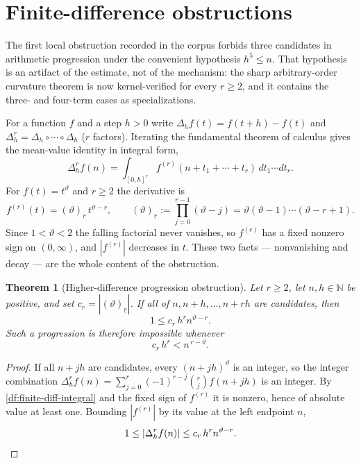 \documentclass[11pt,oneside]{article}
\newtheorem{theorem}{Theorem}[section]
\theoremstyle{definition}
\theoremstyle{remark}
\newcommand{\N}{\mathbb N}
\newcommand{\thetaq}{\vartheta}
\newcommand{\fall}[2]{\left(#1\right)_{\!\underline{#2}}}
\begin{document}
\section{Finite-difference obstructions}
\label{sec:differences}

The first local obstruction recorded in the corpus forbids three candidates in arithmetic
progression under the convenient hypothesis $h^{5}\le n$.  That hypothesis is an artifact of
the estimate, not of the mechanism: the sharp arbitrary-order curvature theorem is now
kernel-verified for every $r\ge2$, and it contains the three- and four-term cases as
specializations.

For a function $f$ and a step $h>0$ write $\Delta_hf(t)=f(t+h)-f(t)$ and
$\Delta_h^{r}=\Delta_h\circ\cdots\circ\Delta_h$ ($r$ factors).  Iterating the fundamental
theorem of calculus gives the mean-value identity in integral form,
\begin{equation}
\Delta_h^{r}f(n)=\int_{[0,h]^{r}}f^{(r)}(n+t_1+\cdots+t_r)\,dt_1\cdots dt_r .
\label{df:finite-diff-integral}
\end{equation}
For $f(t)=t^{\thetaq}$ and $r\ge2$ the derivative is
\[
 f^{(r)}(t)=\fall{\thetaq}{r}\,t^{\thetaq-r},
 \qquad
 \fall{\thetaq}{r}:=\prod_{j=0}^{r-1}(\thetaq-j)
 =\thetaq(\thetaq-1)\cdots(\thetaq-r+1).
\]
Since $1<\thetaq<2$ the falling factorial never vanishes, so $f^{(r)}$ has a fixed nonzero
sign on $(0,\infty)$, and $|f^{(r)}|$ decreases in $t$.  These two facts --- nonvanishing and
decay --- are the whole content of the obstruction.

\begin{theorem}[Higher-difference progression obstruction]
\label{df:thm-higher-difference}
Let $r\ge2$, let $n,h\in\N$ be positive, and set $c_r=|\fall{\thetaq}{r}|$.  If all of
$n,n+h,\dots,n+rh$ are candidates, then
\[
 1\le c_r\,h^{r}n^{\thetaq-r}.
\]
Such a progression is therefore impossible whenever
\begin{equation}
 c_r\,h^{r}<n^{\,r-\thetaq}.
\label{df:progression-condition}
\end{equation}
\end{theorem}

\begin{proof}
If all $n+jh$ are candidates, every $(n+jh)^{\thetaq}$ is an integer, so the integer
combination $\Delta_h^{r}f(n)=\sum_{j=0}^{r}(-1)^{r-j}\binom{r}{j}f(n+jh)$ is an integer.  By
\eqref{df:finite-diff-integral} and the fixed sign of $f^{(r)}$ it is nonzero, hence of
absolute value at least one.  Bounding $|f^{(r)}|$ by its value at the left endpoint $n$,
\[
 1\le|\Delta_h^{r}f(n)|\le c_r\,h^{r}n^{\thetaq-r}. \qedhere
\]
\end{proof}
\end{document}
